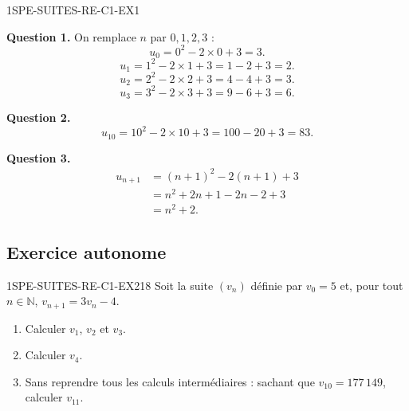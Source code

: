
\begin{corrige}{1SPE-SUITES-RE-C1-EX1}


\textbf{Question 1.} On remplace $n$ par $0, 1, 2, 3$ :
\[
u_0 = 0^2 - 2 \times 0 + 3 = 3.
\]
\[
u_1 = 1^2 - 2 \times 1 + 3 = 1 - 2 + 3 = 2.
\]
\[
u_2 = 2^2 - 2 \times 2 + 3 = 4 - 4 + 3 = 3.
\]
\[
u_3 = 3^2 - 2 \times 3 + 3 = 9 - 6 + 3 = 6.
\]


\textbf{Question 2.}
\[
u_{10} = 10^2 - 2 \times 10 + 3 = 100 - 20 + 3 = 83.
\]


\textbf{Question 3.}
\begin{align*}
u_{n+1} &= (n+1)^2 - 2(n+1) + 3 \\
         &= n^2 + 2n + 1 - 2n - 2 + 3 \\
         &= n^2 + 2.
\end{align*}

\end{corrige}

\subsection*{Exercice autonome}


\begin{exercice}{1SPE-SUITES-RE-C1-EX2}{1}{8}
Soit la suite $(v_n)$ définie par $v_0 = 5$ et, pour tout $n \in \mathbb{N}$, $v_{n+1} = 3v_n - 4$.
\begin{enumerate}
  \item Calculer $v_1$, $v_2$ et $v_3$.
  \item Calculer $v_4$.
  \item Sans reprendre tous les calculs intermédiaires : sachant que
  $v_{10} = 177\,149$, calculer $v_{11}$.
\end{enumerate}
\end{exercice}

